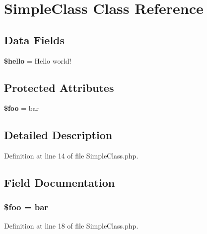 \section{Simple\+Class Class Reference}
\label{class_psy_1_1_test_1_1_presenter_1_1_fixtures_1_1_simple_class}
\subsection*{Data Fields}
\begin{DoxyCompactItemize}
\item 
{\bf \$hello} = \textquotesingle{}Hello world!\textquotesingle{}
\end{DoxyCompactItemize}
\subsection*{Protected Attributes}
\begin{DoxyCompactItemize}
\item 
{\bf \$foo} = \textquotesingle{}bar\textquotesingle{}
\end{DoxyCompactItemize}


\subsection{Detailed Description}


Definition at line 14 of file Simple\+Class.\+php.



\subsection{Field Documentation}
\subsubsection[{\$foo}]{\setlength{\rightskip}{0pt plus 5cm}\${\bf foo} = \textquotesingle{}bar\textquotesingle{}\hspace{0.3cm}{\ttfamily [protected]}}\label{class_psy_1_1_test_1_1_presenter_1_1_fixtures_1_1_simple_class_a7a1efa8a0f6183fb3a5e8e8b0696526c}


Definition at line 18 of file Simple\+Class.\+php.

